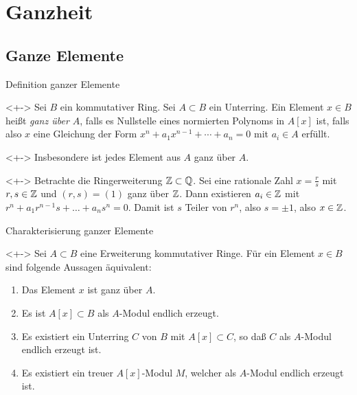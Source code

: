 \section{Ganzheit}

\subsection{Ganze Elemente}

\begin{frame}{Definition ganzer Elemente}
	\begin{definition}<+->
		Sei \(B\) ein kommutativer Ring. Sei \(A \subset B\) ein Unterring.
		Ein Element \(x \in B\) heißt \emph{ganz über \(A\)}, falls es
		Nullstelle eines normierten Polynoms in \(A[x]\) ist, falls also
		\(x\) eine Gleichung der Form \(x^n + a_1 x^{n - 1} + \dotsb + a_n = 0\)
		mit \(a_i \in A\) erfüllt.
	\end{definition}
	\begin{visibleenv}<+->
		Insbesondere ist jedes Element aus \(A\) ganz über \(A\).
	\end{visibleenv}
	\begin{example}<+->
		Betrachte die Ringerweiterung \(\mathbb Z \subset \mathbb Q\). Sei eine
		rationale Zahl \(x = \frac r s\) mit \(r, s \in \mathbb Z\) und
		\((r, s) = (1)\) ganz über \(\mathbb Z\). Dann existieren
		\(a_i \in \mathbb Z\) mit \(r^n + a_1 r^{n - 1} s + \dotsc + a_n s^n = 0\).
		Damit ist \(s\) Teiler von \(r^n\), also \(s = \pm 1\), also \(x \in
		\mathbb Z\).
	\end{example}
\end{frame}

\begin{frame}{Charakterisierung ganzer Elemente}
	\begin{proposition}<+->
		Sei \(A \subset B\) eine Erweiterung kommutativer Ringe. Für ein
		Element \(x \in B\) sind folgende Aussagen äquivalent:
		\begin{enumerate}[<+->]
		\item
			Das Element \(x\) ist ganz über \(A\).
		\item
			Es ist \(A[x] \subset B\) als \(A\)-Modul endlich erzeugt.
		\item
			Es existiert ein Unterring \(C\) von \(B\) mit \(A[x] \subset C\),
			so daß \(C\) als \(A\)-Modul endlich erzeugt ist.
		\item
			Es existiert ein treuer \(A[x]\)-Modul \(M\), welcher als
			\(A\)-Modul endlich erzeugt ist.
		\end{enumerate}
	\end{proposition}
\end{frame}

